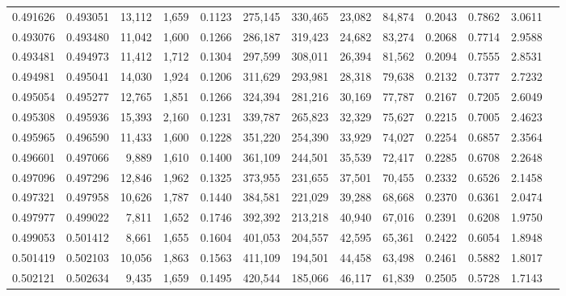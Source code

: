 \begin{tabular}{rrrrrrrrrrrrr}
0.491626 & 0.493051 & 13,112 & 1,659 &                                     0.1123 & 275,145 & 330,465 &  23,082 &  84,874 & 0.2043 & 0.7862 & 3.0611 \\
0.493076 & 0.493480 & 11,042 & 1,600 &                                     0.1266 & 286,187 & 319,423 &  24,682 &  83,274 & 0.2068 & 0.7714 & 2.9588 \\
0.493481 & 0.494973 & 11,412 & 1,712 &                                     0.1304 & 297,599 & 308,011 &  26,394 &  81,562 & 0.2094 & 0.7555 & 2.8531 \\
0.494981 & 0.495041 & 14,030 & 1,924 &                                     0.1206 & 311,629 & 293,981 &  28,318 &  79,638 & 0.2132 & 0.7377 & 2.7232 \\
0.495054 & 0.495277 & 12,765 & 1,851 &                                     0.1266 & 324,394 & 281,216 &  30,169 &  77,787 & 0.2167 & 0.7205 & 2.6049 \\
0.495308 & 0.495936 & 15,393 & 2,160 &                                     0.1231 & 339,787 & 265,823 &  32,329 &  75,627 & 0.2215 & 0.7005 & 2.4623 \\
0.495965 & 0.496590 & 11,433 & 1,600 &                                     0.1228 & 351,220 & 254,390 &  33,929 &  74,027 & 0.2254 & 0.6857 & 2.3564 \\
0.496601 & 0.497066 &  9,889 & 1,610 &                                     0.1400 & 361,109 & 244,501 &  35,539 &  72,417 & 0.2285 & 0.6708 & 2.2648 \\
0.497096 & 0.497296 & 12,846 & 1,962 &                                     0.1325 & 373,955 & 231,655 &  37,501 &  70,455 & 0.2332 & 0.6526 & 2.1458 \\
0.497321 & 0.497958 & 10,626 & 1,787 &                                     0.1440 & 384,581 & 221,029 &  39,288 &  68,668 & 0.2370 & 0.6361 & 2.0474 \\
0.497977 & 0.499022 &  7,811 & 1,652 &                                     0.1746 & 392,392 & 213,218 &  40,940 &  67,016 & 0.2391 & 0.6208 & 1.9750 \\
0.499053 & 0.501412 &  8,661 & 1,655 &                                     0.1604 & 401,053 & 204,557 &  42,595 &  65,361 & 0.2422 & 0.6054 & 1.8948 \\
0.501419 & 0.502103 & 10,056 & 1,863 &                                     0.1563 & 411,109 & 194,501 &  44,458 &  63,498 & 0.2461 & 0.5882 & 1.8017 \\
0.502121 & 0.502634 &  9,435 & 1,659 &                                     0.1495 & 420,544 & 185,066 &  46,117 &  61,839 & 0.2505 & 0.5728 & 1.7143 \\

\end{tabular}
